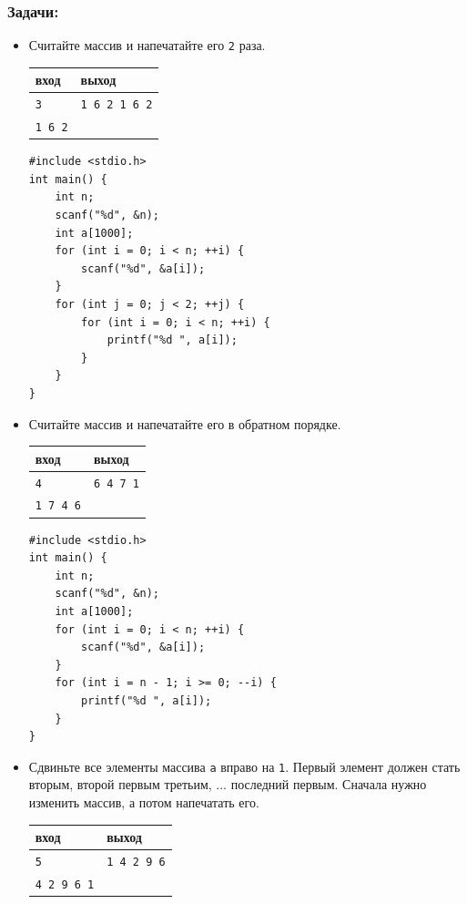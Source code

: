 \documentclass{article}
\begin{document}
\subsubsection*{Задачи:}
\begin{itemize}
\item Считайте массив и напечатайте его \texttt{2} раза.
\begin{center}
\begin{tabular}{ l | l }
 вход & выход \\ \hline
 \texttt{3} & \texttt{1 6 2 1 6 2}  \\ 
 \texttt{1 6 2} &   \\
\end{tabular}
\end{center}
\begin{lstlisting}[backgroundcolor = \color{solcolor}]
#include <stdio.h>
int main() {
    int n;
    scanf("%d", &n);
    int a[1000];
    for (int i = 0; i < n; ++i) {
        scanf("%d", &a[i]);
    }
    for (int j = 0; j < 2; ++j) {
        for (int i = 0; i < n; ++i) {
            printf("%d ", a[i]);
        }
    }
}
\end{lstlisting}


\item Считайте массив и напечатайте его в обратном порядке.
\begin{center}
\begin{tabular}{ l | l }
 вход & выход \\ \hline
 \texttt{4} & \texttt{6 4 7 1}  \\ 
 \texttt{1 7 4 6} &   \\
\end{tabular}
\end{center}
\begin{lstlisting}[backgroundcolor = \color{solcolor}]
#include <stdio.h>
int main() {
    int n;
    scanf("%d", &n);
    int a[1000];
    for (int i = 0; i < n; ++i) {
        scanf("%d", &a[i]);
    }
    for (int i = n - 1; i >= 0; --i) {
        printf("%d ", a[i]);
    }
}
\end{lstlisting}

\item Сдвиньте все элементы массива \texttt{a} вправо на \texttt{1}. Первый элемент должен стать вторым, второй первым третьим, ... последний первым. Сначала нужно изменить массив, а потом напечатать его.
\begin{center}
\begin{tabular}{ l | l }
 вход & выход \\ \hline
 \texttt{5} & \texttt{1 4 2 9 6}  \\ 
 \texttt{4 2 9 6 1} &   \\
\end{tabular}
\end{center}


\end{itemize}
\end{document}
